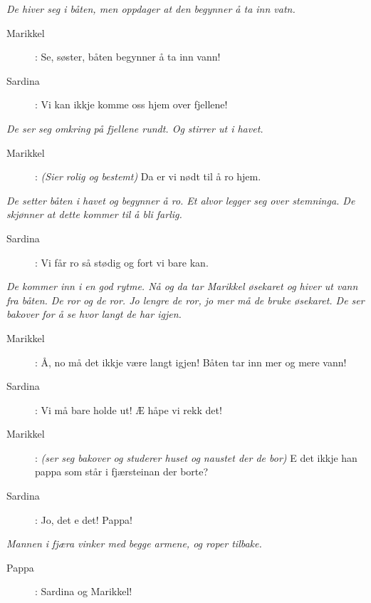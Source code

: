 {\noindent \textit{\color{gray} De hiver seg i båten, men oppdager at den begynner å ta inn vatn.}

\begin{description}
\item[Marikkel]: Se, søster, båten begynner å ta inn vann!
\item[Sardina]: Vi kan ikkje komme oss hjem over fjellene!
\end{description}

\noindent \textit{\color{gray} De ser seg omkring på fjellene rundt. Og stirrer ut i havet.}

\begin{description}
\item[Marikkel]: \textit{\color{gray} (Sier rolig og bestemt)} Da er vi nødt til å ro hjem. 
\end{description}

\noindent \textit{\color{gray} De setter båten i havet og begynner å ro. Et alvor legger seg over stemninga. De skjønner at dette kommer til å bli farlig.} 

\begin{description}
\item[Sardina]: Vi får ro så stødig og fort vi bare kan. 
\end{description}

\noindent \textit{\color{gray} De kommer inn i en god rytme. Nå og da tar Marikkel øsekaret og hiver ut vann fra båten. De ror og de ror. Jo lengre de ror, jo mer må de bruke øsekaret. De ser bakover for å se hvor langt de har igjen.}

\begin{description}
\item[Marikkel]: Å, no må det ikkje være langt igjen! Båten tar inn mer og mere vann! 
\item[Sardina]: Vi må bare holde ut! Æ håpe vi rekk det!
\item[Marikkel]: \textit{\color{gray} (ser seg bakover og studerer huset og naustet der de bor)} E det ikkje han pappa som står i fjærsteinan der borte?
\item[Sardina]: Jo, det e det! Pappa!
\end{description}

\noindent \textit{\color{gray} Mannen i fjæra vinker med begge armene, og roper tilbake.}

\begin{description}
\item[Pappa]: Sardina og Marikkel!
\end{description}

}
